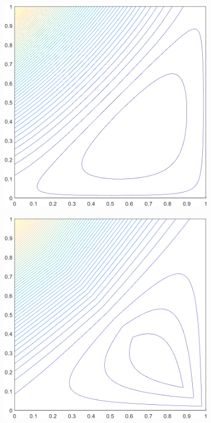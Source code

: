 \documentclass[11pt]{article}
\begin{document}
\begin{figure}
\centering
	\begin{subfigure}[b]{0.240\textwidth}
		\centering
		\includegraphics[width=\textwidth]{figures/square_WACHSPRESS2_contour_b4.png}
		\caption{}
	\end{subfigure}
	\hspace{1cm}
	\begin{subfigure}[b]{0.240\textwidth}
		\centering
		\includegraphics[width=\textwidth]{figures/square_PWLD2_contour_b4.png}

\end{subfigure}
\end{figure}
\end{document}
